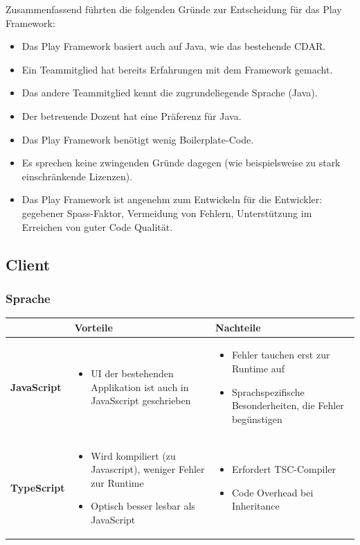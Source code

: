 			
			Zusammenfassend führten die folgenden Gründe zur Entscheidung für das Play Framework:
			\begin{itemize}
				\item Das Play Framework basiert auch auf Java, wie das bestehende CDAR.
				\item Ein Teammitglied hat bereits Erfahrungen mit dem Framework gemacht.
				\item Das andere Teammitglied kennt die zugrundeliegende Sprache (Java).
				\item Der betreuende Dozent hat eine Präferenz für Java.
				\item Das Play Framework benötigt wenig Boilerplate-Code.
				\item Es sprechen keine zwingenden Gründe dagegen (wie beispielsweise zu stark einschränkende Lizenzen).
				\item Das Play Framework ist angenehm zum Entwickeln für die Entwickler: gegebener Spass-Faktor, Vermeidung von Fehlern, Unterstützung im Erreichen von guter Code Qualität.
			\end{itemize}

			

	\subsection{Client}
		\subsubsection{Sprache}
			\begin{tabularx}{\textwidth}{|lXX|}
				\hline
					\textbf{} & \textbf{Vorteile} & \textbf{Nachteile}\\
				\hline
					\textbf{JavaScript} & 
					\begin{itemize}
						\item UI der bestehenden Applikation ist auch in JavaSscript geschrieben
					\end{itemize} & 
					\begin{itemize}
						\item Fehler tauchen erst zur Runtime auf
						\item Sprachspezifische Besonderheiten, die Fehler begünstigen
					\end{itemize} \\
				\hline
					\textbf{TypeScript} &
					\begin{itemize}
						\item Wird kompiliert (zu Javascript), weniger Fehler zur Runtime
						\item Optisch besser lesbar als JavaScript
					\end{itemize} &
					\begin{itemize}
						\item Erfordert TSC-Compiler
						\item Code Overhead bei Inheritance
					\end{itemize} \\
				\hline
			\end{tabularx}
			

